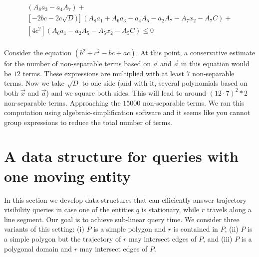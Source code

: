 \documentclass[UKenglish]{lipics-v2019}
\begin{document}
\begin{align*}
[ b^2 - 2b\sqrt{D} + D](A_8 a_3-a_4 A_7) + \\
[-2bc -2c\sqrt{D})](A_8 a_1+ A_6 a_3 - a_4 A_5- a_2 A_7 - A_7x_2 - A_7 C) + \\
[4c^2](A_6 a_1- a_2 A_5 - A_5 x_2 - A_5 C) \le 0 \\
\end{align*}

Consider the equation $(b^2 + c^2 - bc + ac)$. At this point, a conservative estimate for the number of non-separable terms based on $\vec{a}$ and $\vec{a}$ in this equation would be $12$ terms. These expressions are multiplied with at least $7$ non-separable terms. Now we take $\sqrt{D}$ to one side (and with it, several polynomials based on both $\vec{x}$ and $\vec{a}$) and we square both sides. This will lead to around $(12\cdot 7)^2 * 2$ non-separable terms. Approaching the $15000$ non-separable terms. We ran this computation using algebraic-simplification software and it seems like you cannot group expressions to reduce the total number of terms.








\section{A data structure for queries with one moving entity}
\label{app:pointline}

In this section we develop data structures that can efficiently answer
trajectory visibility queries in case one of the entities $q$ is
stationary, while $r$ travels along a line segment. Our goal is to
achieve sub-linear query time. We consider three variants of this
setting: (i) $P$ is a simple polygon and $r$ is contained in $P$, (ii)
$P$ is a simple polygon but the trajectory of $r$ may intersect edges
of $P$, and (iii) $P$ is a polygonal domain and $r$ may intersect edges of $P$.
\end{document}
